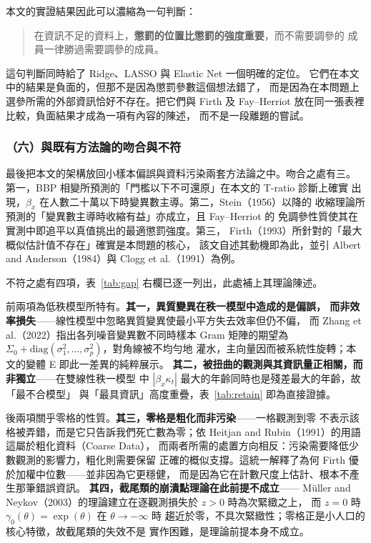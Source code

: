 \documentclass[UTF8, fontset=macnew, a4paper, 12pt]{ctexart}
\begin{document}
本文的實證結果因此可以濃縮為一句判斷：

\begin{quote}
在資訊不足的資料上，\textbf{懲罰的位置比懲罰的強度重要}，而不需要調參的
成員一律勝過需要調參的成員。
\end{quote}

這句判斷同時給了 Ridge、LASSO 與 Elastic Net 一個明確的定位。
它們在本文中的結果是負面的，但那不是因為懲罰參數這個想法錯了，
而是因為在本問題上選參所需的外部資訊恰好不存在。把它們與 Firth 及
Fay--Herriot 放在同一張表裡比較，負面結果才成為一項有內容的陳述，
而不是一段離題的嘗試。

\subsubsection{（六）與既有方法論的吻合與不符}

最後把本文的架構放回小樣本偏誤與資料污染兩套方法論之中。吻合之處有三。
第一，BBP 相變所預測的「門檻以下不可還原」在本文的 T-ratio 診斷上確實
出現，$\beta_x$ 在人數二十萬以下時變異數主導。第二，Stein（1956）以降的
收縮理論所預測的「變異數主導時收縮有益」亦成立，且 Fay--Herriot 的
免調參性質使其在實測中即追平以真值挑出的最適懲罰強度。第三，
Firth（1993）所針對的「最大概似估計值不存在」確實是本問題的核心，
該文自述其動機即為此，並引 Albert and Anderson（1984）與
Clogg et al.（1991）為例。

不符之處有四項，表~\ref{tab:gap} 右欄已逐一列出，此處補上其理論陳述。

前兩項為低秩模型所特有。\textbf{其一，異質變異在秩一模型中造成的是偏誤，
而非效率損失}——線性模型中忽略異質變異使最小平方失去效率但仍不偏，
而 Zhang et al.（2022）指出各列噪音變異數不同時樣本 Gram 矩陣的期望為
$\Sigma_0+\mathrm{diag}(\sigma_1^2,\dots,\sigma_p^2)$，對角線被不均勻地
灌水，主向量因而被系統性旋轉；本文的變體 E 即此一差異的純粹展示。
\textbf{其二，被扭曲的觀測與其資訊量正相關，而非獨立}——在雙線性秩一模型
中 $|\beta_x\kappa_t|$ 最大的年齡同時也是殘差最大的年齡，故「最不合模型」
與「最具資訊」高度重疊，表~\ref{tab:retain} 即為直接證據。

後兩項關乎零格的性質。\textbf{其三，零格是粗化而非污染}——一格觀測到零
不表示該格被弄錯，而是它只告訴我們死亡數為零；依
Heitjan and Rubin（1991）的用語這屬於粗化資料（Coarse Data），
而兩者所需的處置方向相反：污染需要降低少數觀測的影響力，粗化則需要保留
正確的概似支撐。這統一解釋了為何 Firth 優於加權中位數——並非因為它更穩健，
而是因為它在計數尺度上估計、根本不產生那筆錯誤資訊。
\textbf{其四，截尾類的崩潰點理論在此前提不成立}——
Müller and Neykov（2003）的理論建立在逐觀測損失於 $z>0$ 時為次緊緻之上，
而 $z=0$ 時 $\gamma_0(\theta)=\exp(\theta)$ 在 $\theta\to-\infty$ 時
趨近於零，不具次緊緻性；零格正是小人口的核心特徵，故截尾類的失效不是
實作困難，是理論前提本身不成立。
\end{document}
